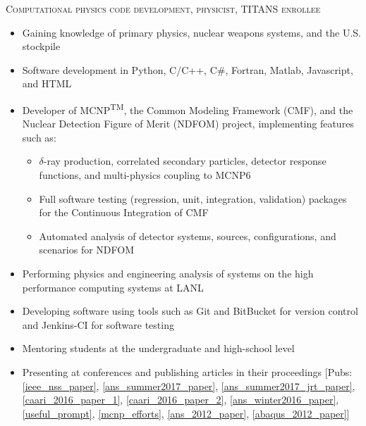 \begin{center}
	\begin{minipage}{0.99\textwidth}
		\begin{center}
			\textsc{\Large Computational physics code development, physicist, TITANS enrollee} \vspace{2mm}
		\end{center}
	\end{minipage}
\end{center}
\begin{minipage}{\textwidth}
    \begin{center}
	\begin{itemize}
	    \item Gaining knowledge of primary physics, nuclear weapons systems, and the U.S. stockpile
	    \item Software development in Python, C/C++, C\#, Fortran, Matlab, Javascript, and HTML
	    \item Developer of \textsc{MCNP}\textsuperscript{TM}, the Common Modeling Framework (\textsc{CMF}), and the Nuclear Detection Figure of Merit (\textsc{NDFOM}) project, implementing features such as: \vspace{2mm}
	    \begin{itemize}
  	    \item $\delta$-ray production, correlated secondary particles, detector response functions, and multi-physics coupling to \textsc{MCNP6} 
	    \item Full software testing (regression, unit, integration, validation) packages for the Continuous Integration of \textsc{CMF}
	    \item Automated analysis of detector systems, sources, configurations, and scenarios for \textsc{NDFOM}
	\end{itemize}

	\item Performing physics and engineering analysis of systems on the high performance computing systems at LANL
	\item Developing software using tools such as Git and BitBucket for version control and Jenkins-CI for software testing
	\item Mentoring students at the undergraduate and high-school level
	\item Presenting at conferences and publishing articles in their proceedings [Pubs: \ref{ieee_nss_paper}, \ref{ans_summer2017_paper}, \ref{ans_summer2017_jrt_paper}, \ref{caari_2016_paper_1}, \ref{caari_2016_paper_2}, \ref{ans_winter2016_paper}, \ref{useful_prompt}, \ref{mcnp_efforts}, \ref{ans_2012_paper}, \ref{abaqus_2012_paper}]
	\end{itemize}
    \end{center}
\end{minipage}

